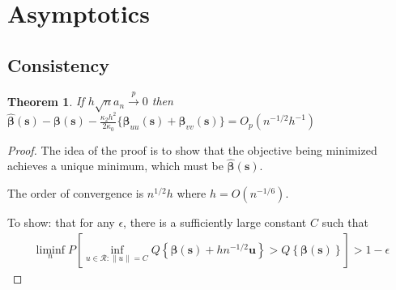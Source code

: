 \documentclass[authoryear, review, 11pt]{elsarticle}
\newtheorem{theorem}{Theorem}[section]
\begin{document}
  
\section{Asymptotics}
  \subsection{Consistency}
  \begin{theorem}\label{theorem:consistency}     
    If $h \sqrt{n} a_n \xrightarrow{p} 0$ then $\hat{\bm{\beta}}(\bm{s}) - \bm{\beta}(\bm{s}) - \frac{\kappa_2 h^2}{2 \kappa_0} \{ \bm{\beta}_{uu}(\bm{s}) + \bm{\beta}_{vv}(\bm{s}) \} = O_p(n^{-1/2} h^{-1} )$
  \end{theorem}
  
  \begin{proof}
    The idea of the proof is to show that the objective being minimized achieves a unique minimum, which must be $\hat{\bm{\beta}}(\bm{s})$.
    
    The order of convergence is $n^{1/2} h$ where $h = O(n^{-1/6})$.
    
    To show: that for any $\epsilon$, there is a sufficiently large constant $C$ such that
    \begin{align*}
      \liminf \limits_n P \left[ \inf_{u \in \mathcal{R}: \|u\| = C} Q \left\{ \bm{\beta}(\bm{s}) + h n^{-1/2} \bm{u} \right\} > Q \left\{ \bm{\beta}(\bm{s}) \right\} \right] > 1 - \epsilon
    \end{align*}
    

\end{proof}
\end{document}
